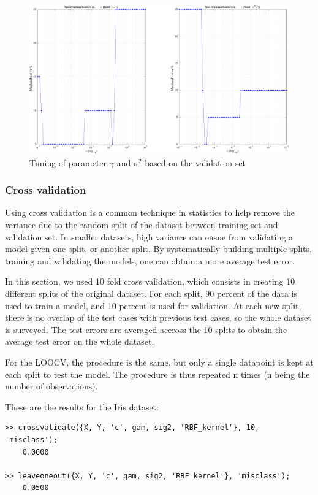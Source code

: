 \documentclass[11pt, a4paper]{article}
\begin{document}
\begin{figure}[H]
    \centering
    \includegraphics[scale=.40]{hyperparams_choice1.pdf}
    \caption{Tuning of parameter $\gamma$ and $\sigma^2$ based on the
      validation set}
    \label{fig:hyperparams_choice1}
\end{figure}

\subsubsection{Cross validation}

Using cross validation is a common technique in statistics to help
remove the variance due to the random split of the dataset between
training set and validation set. In smaller datasets, high variance
can ensue from validating a model given one split, or another
split. By systematically building multiple splits, training and
validating the models, one can obtain a more average test error. 

In this section, we used 10 fold cross validation, which consists in
creating 10 different splits of the original dataset. For each split,
90 percent of the data is used to train a model, and 10 percent is
used for validation. At each new split, there is no overlap of the
test cases with previous test cases, so the whole dataset is
surveyed. The test errors are averaged accross the 10 splits to obtain
the average test error on the whole dataset.

For the LOOCV, the procedure is the same, but only a single datapoint
is kept at each split to test the model. The procedure is thus
repeated n times (n being the number of observations).

These are the results for the Iris dataset:
\begin{verbatim}
>> crossvalidate({X, Y, 'c', gam, sig2, 'RBF_kernel'}, 10, 'misclass');
    0.0600

>> leaveoneout({X, Y, 'c', gam, sig2, 'RBF_kernel'}, 'misclass');
    0.0500
\end{verbatim}
\end{document}

